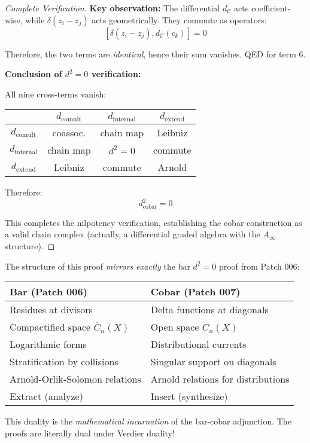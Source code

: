 \begin{proof}[Complete Verification]
\textbf{Key observation:} The differential $d_{\mathcal{C}}$ acts coefficient-wise, 
while $\delta(z_i - z_j)$ acts geometrically. They commute as operators:
$$[\delta(z_i - z_j), d_{\mathcal{C}}(c_k)] = 0$$

Therefore, the two terms are \emph{identical}, hence their sum vanishes. QED for term 6.

\textbf{Conclusion of $d^2 = 0$ verification:}

All nine cross-terms vanish:
\begin{center}
\begin{tabular}{c|ccc}
& $d_{\text{comult}}$ & $d_{\text{internal}}$ & $d_{\text{extend}}$ \\ \hline
$d_{\text{comult}}$ & coassoc. & chain map & Leibniz \\
$d_{\text{internal}}$ & chain map & $d^2=0$ & commute \\
$d_{\text{extend}}$ & Leibniz & commute & Arnold \\
\end{tabular}
\end{center}

Therefore:
$$\boxed{d_{\text{cobar}}^2 = 0}$$

This completes the nilpotency verification, establishing the cobar construction 
as a valid chain complex (actually, a differential graded algebra with the 
$A_\infty$ structure).
\end{proof}

\begin{remark}[Duality with Bar $d^2=0$ Proof]\label{rem:bar-cobar-d2-duality}
The structure of this proof \emph{mirrors exactly} the bar $d^2=0$ proof from 
Patch 006:

\begin{center}
\begin{tabular}{l|l}
\textbf{Bar (Patch 006)} & \textbf{Cobar (Patch 007)} \\ \hline
Residues at divisors & Delta functions at diagonals \\
Compactified space $\overline{C}_n(X)$ & Open space $C_n(X)$ \\
Logarithmic forms & Distributional currents \\
Stratification by collisions & Singular support on diagonals \\
Arnold-Orlik-Solomon relations & Arnold relations for distributions \\
Extract (analyze) & Insert (synthesize) \\
\end{tabular}
\end{center}

This duality is the \emph{mathematical incarnation} of the bar-cobar adjunction. 
The proofs are literally dual under Verdier duality!
\end{remark}

